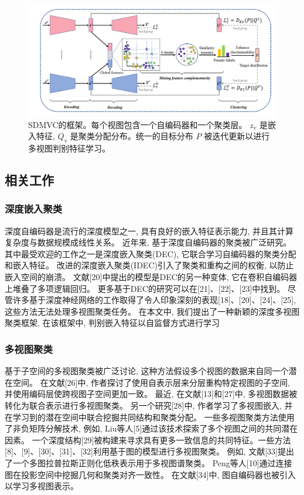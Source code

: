 \documentclass{article}
\begin{document}
\begin{figure}[h]
    \centering
    \includegraphics[width=\linewidth]{./imgs/img2.png}
    \caption{SDMVC的框架。每个视图包含一个自编码器和一个聚类层。 \(z_v\) 是嵌入特征,  \(Q_v\) 是聚类分配分布。统一的目标分布 \(P\) 被迭代更新以进行多视图判别特征学习。}
\end{figure}


\subsection{相关工作}

\subsubsection*{深度嵌入聚类}

深度自编码器是流行的深度模型之一,  具有良好的嵌入特征表示能力,  并且其计算复杂度与数据规模成线性关系。
近年来,  基于深度自编码器的聚类被广泛研究。
其中最受欢迎的工作之一是深度嵌入聚类(DEC), 它联合学习自编码器的聚类分配和嵌入特征。
改进的深度嵌入聚类(IDEC)引入了聚类和重构之间的权衡, 以防止嵌入空间的崩溃。
文献[20]中提出的模型是DEC的另一种变体, 它在卷积自编码器上堆叠了多项逻辑回归。
更多基于DEC的研究可以在[21]、[22]、[23]中找到。
尽管许多基于深度神经网络的工作取得了令人印象深刻的表现[18]、[20]、[24]、[25], 这些方法无法处理多视图聚类任务。
在本文中, 我们提出了一种新颖的深度多视图聚类框架, 在该框架中, 判别嵌入特征以自监督方式进行学习

\subsubsection*{多视图聚类}
基于子空间的多视图聚类被广泛讨论, 这种方法假设多个视图的数据来自同一个潜在空间。
在文献[26]中, 作者探讨了使用自表示层来分层重构特定视图的子空间, 并使用编码层使跨视图子空间更加一致。
最近, 在文献[13]和[27]中, 多视图数据被转化为联合表示进行多视图聚类。
另一个研究[28]中, 作者学习了多视图嵌入, 并在学习到的潜在空间中联合挖掘共同结构和聚类分配。
一些多视图聚类方法使用了非负矩阵分解技术, 例如, Liu等人[5]通过该技术探索了多个视图之间的共同潜在因素。
一个深度结构[29]被构建来寻求具有更多一致信息的共同特征。一些方法[8]、[9]、[30]、[31]、[32]利用基于图的模型进行多视图聚类。
例如, 文献[33]提出了一个多图拉普拉斯正则化低秩表示用于多视图谱聚类。
Peng等人[10]通过连接图在投影空间中挖掘几何和聚类对齐一致性。
在文献[34]中, 图自编码器也被引入以学习多视图表示。
\end{document}
